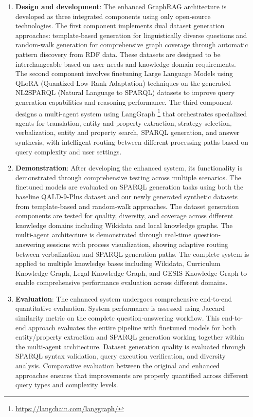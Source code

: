 \begin{enumerate}
    \item \textbf{Design and development}: The enhanced GraphRAG architecture is developed as three integrated components using only open-source technologies. The first component implements dual dataset generation approaches: template-based generation for linguistically diverse questions and random-walk generation for comprehensive graph coverage through automatic pattern discovery from RDF data. These datasets are designed to be interchangeable based on user needs and knowledge domain requirements. The second component involves finetuning Large Language Models using QLoRA (Quantized Low-Rank Adaptation) techniques on the generated NL2SPARQL (Natural Language to SPARQL) datasets to improve query generation capabilities and reasoning performance. The third component designs a multi-agent system using LangGraph \footnote{\url{https://langchain.com/langgraph/}} that orchestrates specialized agents for translation, entity and property extraction, strategy selection, verbalization, entity and property search, SPARQL generation, and answer synthesis, with intelligent routing between different processing paths based on query complexity and user settings.
    \item \textbf{Demonstration}: After developing the enhanced system, its functionality is demonstrated through comprehensive testing across multiple scenarios. The finetuned models are evaluated on SPARQL generation tasks using both the baseline QALD-9-Plus dataset and our newly generated synthetic datasets from template-based and random-walk approaches. The dataset generation components are tested for quality, diversity, and coverage across different knowledge domains including Wikidata and local knowledge graphs. The multi-agent architecture is demonstrated through real-time question-answering sessions with process visualization, showing adaptive routing between verbalization and SPARQL generation paths. The complete system is applied to multiple knowledge bases including Wikidata, Curriculum Knowledge Graph, Legal Knowledge Graph, and GESIS Knowledge Graph to enable comprehensive performance evaluation across different domains.
    \item \textbf{Evaluation}: The enhanced system undergoes comprehensive end-to-end quantitative evaluation. System performance is assessed using Jaccard similarity metric on the complete question-answering workflow. This end-to-end approach evaluates the entire pipeline with finetuned models for both entity/property extraction and SPARQL generation working together within the multi-agent architecture. Dataset generation quality is evaluated through SPARQL syntax validation, query execution verification, and diversity analysis. Comparative evaluation between the original and enhanced approaches ensures that improvements are properly quantified across different query types and complexity levels.

\end{enumerate}
